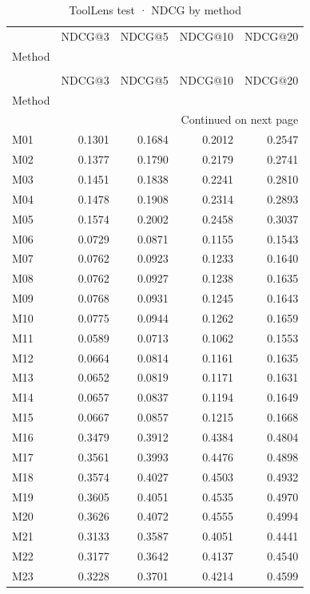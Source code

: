 \begin{longtable}{lrrrr}
\caption{ToolLens test · NDCG by method} \label{tab:ToolLens-test-family-family-ndcg} \\
\toprule
 & NDCG@3 & NDCG@5 & NDCG@10 & NDCG@20 \\
Method &  &  &  &  \\
\midrule
\endfirsthead
\caption[]{ToolLens test · NDCG by method} \\
\toprule
 & NDCG@3 & NDCG@5 & NDCG@10 & NDCG@20 \\
Method &  &  &  &  \\
\midrule
\endhead
\midrule
\multicolumn{5}{r}{Continued on next page} \\
\midrule
\endfoot
\bottomrule
\endlastfoot
M01 & 0.1301 & 0.1684 & 0.2012 & 0.2547 \\
M02 & 0.1377 & 0.1790 & 0.2179 & 0.2741 \\
M03 & 0.1451 & 0.1838 & 0.2241 & 0.2810 \\
M04 & 0.1478 & 0.1908 & 0.2314 & 0.2893 \\
M05 & 0.1574 & 0.2002 & 0.2458 & 0.3037 \\
M06 & 0.0729 & 0.0871 & 0.1155 & 0.1543 \\
M07 & 0.0762 & 0.0923 & 0.1233 & 0.1640 \\
M08 & 0.0762 & 0.0927 & 0.1238 & 0.1635 \\
M09 & 0.0768 & 0.0931 & 0.1245 & 0.1643 \\
M10 & 0.0775 & 0.0944 & 0.1262 & 0.1659 \\
M11 & 0.0589 & 0.0713 & 0.1062 & 0.1553 \\
M12 & 0.0664 & 0.0814 & 0.1161 & 0.1635 \\
M13 & 0.0652 & 0.0819 & 0.1171 & 0.1631 \\
M14 & 0.0657 & 0.0837 & 0.1194 & 0.1649 \\
M15 & 0.0667 & 0.0857 & 0.1215 & 0.1668 \\
M16 & 0.3479 & 0.3912 & 0.4384 & 0.4804 \\
M17 & 0.3561 & 0.3993 & 0.4476 & 0.4898 \\
M18 & 0.3574 & 0.4027 & 0.4503 & 0.4932 \\
M19 & 0.3605 & 0.4051 & 0.4535 & 0.4970 \\
M20 & 0.3626 & 0.4072 & 0.4555 & 0.4994 \\
M21 & 0.3133 & 0.3587 & 0.4051 & 0.4441 \\
M22 & 0.3177 & 0.3642 & 0.4137 & 0.4540 \\
M23 & 0.3228 & 0.3701 & 0.4214 & 0.4599 \\

\end{longtable}
